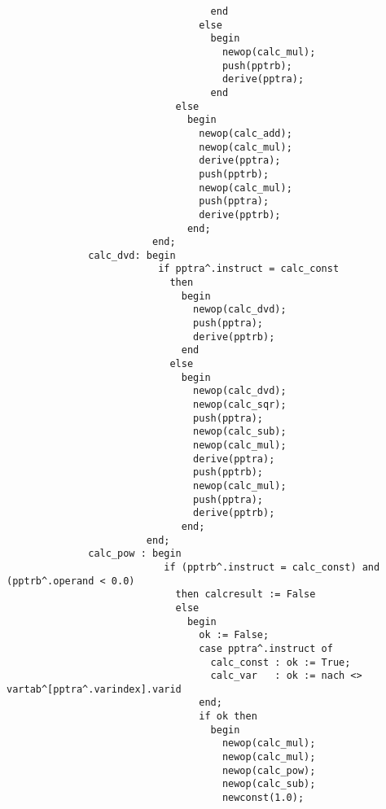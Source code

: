 \begin{refsection}
\begin{lstlisting}
                                   end
                                 else
                                   begin
                                     newop(calc_mul);
                                     push(pptrb);
                                     derive(pptra);
                                   end
                             else
                               begin
                                 newop(calc_add);
                                 newop(calc_mul);
                                 derive(pptra);
                                 push(pptrb);
                                 newop(calc_mul);
                                 push(pptra);
                                 derive(pptrb);
                               end;
                         end;
              calc_dvd: begin
                          if pptra^.instruct = calc_const
                            then
                              begin
                                newop(calc_dvd);
                                push(pptra);
                                derive(pptrb);
                              end
                            else
                              begin
                                newop(calc_dvd);
                                newop(calc_sqr);
                                push(pptra);
                                newop(calc_sub);
                                newop(calc_mul);
                                derive(pptra);
                                push(pptrb);
                                newop(calc_mul);
                                push(pptra);
                                derive(pptrb);
                              end;
                        end;
              calc_pow : begin
                           if (pptrb^.instruct = calc_const) and (pptrb^.operand < 0.0)
                             then calcresult := False
                             else
                               begin
                                 ok := False;
                                 case pptra^.instruct of
                                   calc_const : ok := True;
                                   calc_var   : ok := nach <> vartab^[pptra^.varindex].varid
                                 end;
                                 if ok then
                                   begin
                                     newop(calc_mul);
                                     newop(calc_mul);
                                     newop(calc_pow);
                                     newop(calc_sub);
                                     newconst(1.0);

\end{lstlisting}
\end{refsection}
